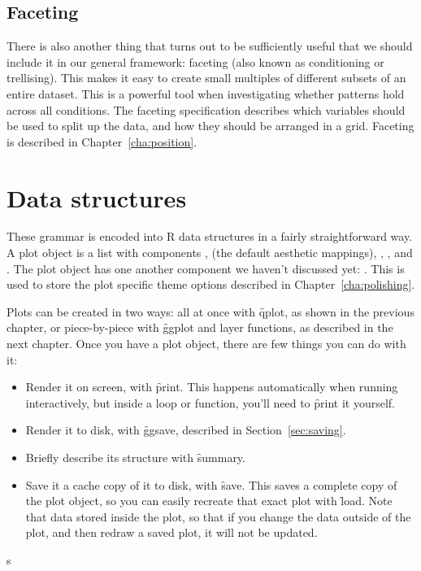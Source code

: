 \subsection{Faceting}\label{sec:intro-faceting}

There is also another thing that turns out to be sufficiently useful that we should include it in our general framework: faceting (also known as conditioning or trellising). This makes it easy to create small multiples of different subsets of an entire dataset. This is a powerful tool when investigating whether patterns hold across all conditions.  The faceting specification describes which variables should be used to split up the data, and how they should be arranged in a grid.  Faceting is described in Chapter~\ref{cha:position}.

\section{Data structures}
\label{sec:data-structures}

These grammar is encoded into R data structures in a fairly straightforward way.  A plot object is a list with components ,  (the default aesthetic mappings), , ,  and .  The plot object has one another component we haven't discussed yet: .  This is used to store the plot specific theme options described in Chapter~\ref{cha:polishing}.  

Plots can be created in two ways: all at once with \f{qplot}, as shown in the previous chapter, or piece-by-piece with \f{ggplot} and layer functions, as described in the next chapter.  Once you have a plot object, there are few things you can do with it:

\begin{itemize}
  \item Render it on screen, with \f{print}.  This happens automatically when
  running interactively, but inside a loop or function, you'll need to
  \f{print} it yourself.
  
  \item Render it to disk, with \f{ggsave}, described in Section~\ref{sec:saving}.

  \item Briefly describe its structure with \f{summary}.
  
  \item Save it a cache copy of it to disk, with \f{save}.  This saves a complete copy of the plot object, so you can easily recreate that exact plot with \f{load}.  Note that data stored inside the plot, so that if you change the data outside of the plot, and then redraw a saved plot, it will not be updated. 
\end{itemize}


s
